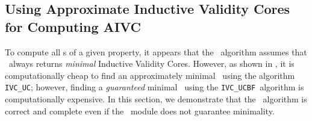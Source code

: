 \subsection{Using Approximate Inductive Validity Cores for Computing AIVC}
\label{subsec:minimality}
\newcommand{\ucalg}{\texttt{\small{IVC\_UC}}}
\newcommand{\ucbfalg}{\texttt{\small{IVC\_UCBF}}}

To compute all \ivc s of a given property, it appears that the \aivcalg ~algorithm
assumes that \getivc\ always returns \emph{minimal} Inductive Validity Cores.
However, as shown in \cite{Ghass16}, it is computationally cheap to find an
approximately minimal \ivc\ using the algorithm \ucalg; however, finding a {\em guaranteed} minimal \ivc\ using the \ucbfalg\ algorithm is computationally expensive.  In this section,
we demonstrate that the \aivcalg ~algorithm is correct and complete even if the \getivc ~module does not guarantee minimality.  %



